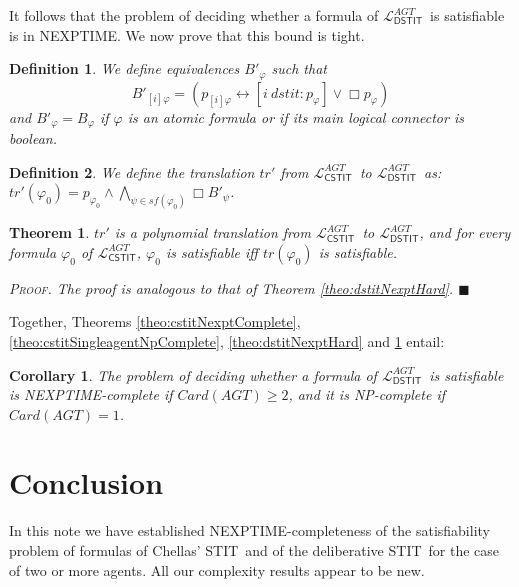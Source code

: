 \documentclass{article}
\newtheorem{definition}{Definition}
\newtheorem{theorem}{Theorem}
\newtheorem{corollary}{Corollary}
\newenvironment{pf}{\em \medskip\noindent \textsc{Proof.}}
{\hspace*{\fill}\nolinebreak[2]\hspace*{\fill}$\blacksquare$\medskip}
\renewcommand{\phi}{\varphi}
\newcommand{\card}[1]{\mathit{Card}(#1)}           \newcommand{\ext}[1]{|#1|}
\newcommand{\eqv}{\leftrightarrow}      \newcommand{\imp}{\rightarrow}          \newcommand{\subfml}{\mathit{sf}}
\newcommand{\cstit}[1]{[{#1}]}           \newcommand{\poscstit}[1]{\langle {#1} \rangle}    \newcommand{\dstit}[2]{[{#1}\ \mathit{dstit}\! :{#2}]}
\newcommand{\agtset}{\ensuremath{\mathit{AGT}}}
\newcommand{\STIT} {{\textsf{STIT}}}              \newcommand{\CSTIT}{{\textsf{CSTIT}}}            \newcommand{\DSTIT}{{\textsf{DSTIT}}}
\newcommand{\LCSTIT}{$\mathcal{L}_{\mathsf{CSTIT}}^\agtset$}
\newcommand{\LDSTIT}{$\mathcal{L}_{\mathsf{DSTIT}}^\agtset$}
\begin{document}
It follows that the problem of deciding whether a formula of \LDSTIT\ is
satisfiable is in NEXPTIME.
We now prove that this bound is tight.

\begin{definition}
We define equivalences $B'_\phi$ such that
$$B'_{\cstit{i}\phi}  =  (p_{\cstit{i}\phi} \eqv
                         [i\ \mathit{dstit}\! :p_\phi] \lor \Box p_{\phi} )$$
and $B'_\phi = B_\phi$ if $\phi$ is an atomic formula or if its main
logical connector is boolean.
\end{definition}

\begin{definition}
We define the translation $tr' $ from \LCSTIT\ to \LDSTIT\ as:
$tr'(\phi_0) =
p_{\phi_0} \land \bigwedge_{\psi \in \subfml(\phi_0)} \Box B'_\psi $.
\end{definition}

\begin{theorem}\label{theo:dstitInNexpt}
$tr'$ is a polynomial translation from \LCSTIT\ to \LDSTIT, and
for every formula $\phi_0$ of \LCSTIT,
$\phi_0$ is satisfiable iff $tr(\phi_0) $ is satisfiable.

\begin{pf}
The proof is analogous to that of Theorem \ref{theo:dstitNexptHard}.
\end{pf}
\end{theorem}

Together, Theorems \ref{theo:cstitNexptComplete}, \ref{theo:cstitSingleagentNpComplete},
\ref{theo:dstitNexptHard} and \ref{theo:dstitInNexpt} entail:

\begin{corollary}
The problem of deciding whether a formula of \LDSTIT\ is satisfiable is
NEXPTIME-complete if $\card{\agtset} \geq 2$, and
it is NP-complete if $\card{\agtset} = 1$.
\end{corollary}









\section{Conclusion}\label{sec:conclusion}


In this note we have established NEXPTIME-completeness of the satisfiability problem
of formulas of Chellas' \STIT\ and of the deliberative \STIT\
for the case of two or more agents.
All our complexity results appear to be new.
\end{document}
